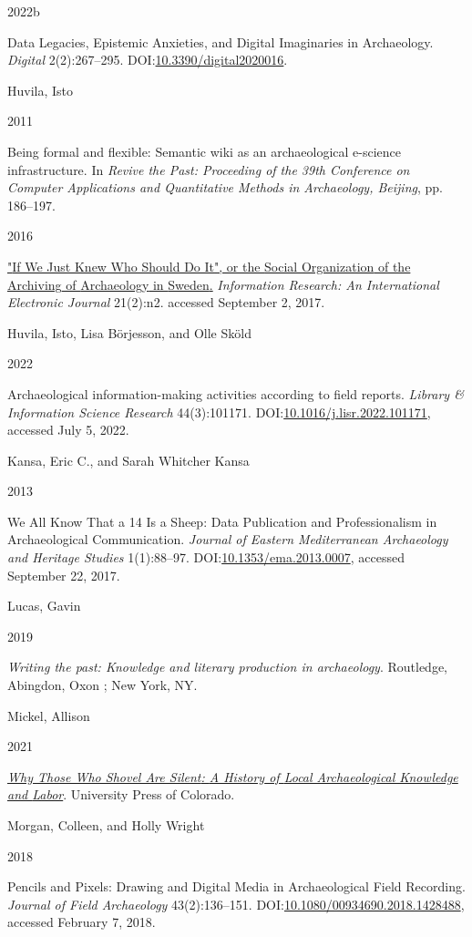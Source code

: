 \documentclass[
]{article}
\newlength{\cslhangindent}
\newlength{\csllabelwidth}
\newenvironment{CSLReferences}[2] %
 {\begin{list}{}{%
  \setlength{\itemindent}{0pt}
  \setlength{\leftmargin}{0pt}
  \setlength{\parsep}{0pt}
  \ifodd #1
   \setlength{\leftmargin}{\cslhangindent}
   \setlength{\itemindent}{-1\cslhangindent}
  \fi
  \setlength{\itemsep}{#2\baselineskip}}}
 {\end{list}}
\newcommand{\CSLBlock}[1]{\hfill\break\parbox[t]{\linewidth}{\strut\ignorespaces#1\strut}}
\newcommand{\CSLLeftMargin}[1]{\parbox[t]{\csllabelwidth}{\strut#1\strut}}
\newcommand{\CSLRightInline}[1]{\parbox[t]{\linewidth - \csllabelwidth}{\strut#1\strut}}
\begin{document}
\begin{CSLReferences}{0}{1}
\CSLLeftMargin{ 2022b }%
\CSLRightInline{Data {Legacies}, {Epistemic Anxieties}, and {Digital
Imaginaries} in {Archaeology}. \emph{Digital} 2(2):267--295.
DOI:\href{https://doi.org/10.3390/digital2020016}{10.3390/digital2020016}.}

\CSLBlock{Huvila, Isto}
\CSLLeftMargin{ 2011}%
\CSLRightInline{Being formal and flexible: Semantic wiki as an
archaeological e-science infrastructure. In \emph{Revive the {Past}:
{Proceeding} of the 39th {Conference} on {Computer Applications} and
{Quantitative Methods} in {Archaeology}, {Beijing}}, pp. 186--197.}

\CSLLeftMargin{ 2016 }%
\CSLRightInline{\href{https://eric.ed.gov/?id=EJ1104372}{"{If We Just
Knew Who Should Do It}", or the {Social Organization} of the {Archiving}
of {Archaeology} in {Sweden}.} \emph{Information Research: An
International Electronic Journal} 21(2):n2. accessed September 2, 2017.}

\CSLBlock{Huvila, Isto, Lisa Börjesson, and Olle Sköld}
\CSLLeftMargin{ 2022}%
\CSLRightInline{Archaeological information-making activities according
to field reports. \emph{Library \& Information Science Research}
44(3):101171.
DOI:\href{https://doi.org/10.1016/j.lisr.2022.101171}{10.1016/j.lisr.2022.101171},
accessed July 5, 2022.}

\CSLBlock{Kansa, Eric C., and Sarah Whitcher Kansa}
\CSLLeftMargin{ 2013}%
\CSLRightInline{We {All Know That} a 14 {Is} a {Sheep}: {Data
Publication} and {Professionalism} in {Archaeological Communication}.
\emph{Journal of Eastern Mediterranean Archaeology and Heritage Studies}
1(1):88--97.
DOI:\href{https://doi.org/10.1353/ema.2013.0007}{10.1353/ema.2013.0007},
accessed September 22, 2017.}

\CSLBlock{Lucas, Gavin}
\CSLLeftMargin{ 2019}%
\CSLRightInline{\emph{Writing the past: {Knowledge} and literary
production in archaeology}. Routledge, Abingdon, Oxon ; New York, NY.}

\CSLBlock{Mickel, Allison}
\CSLLeftMargin{ 2021}%
\CSLRightInline{\emph{\href{https://doi.org/10.5876/9781646421152}{Why
{Those Who Shovel Are Silent}: {A History} of {Local Archaeological
Knowledge} and {Labor}}}. University Press of Colorado.}

\CSLBlock{Morgan, Colleen, and Holly Wright}
\CSLLeftMargin{ 2018}%
\CSLRightInline{Pencils and {Pixels}: {Drawing} and {Digital Media} in
{Archaeological Field Recording}. \emph{Journal of Field Archaeology}
43(2):136--151.
DOI:\href{https://doi.org/10.1080/00934690.2018.1428488}{10.1080/00934690.2018.1428488},
accessed February 7, 2018.}


\end{CSLReferences}
\end{document}
